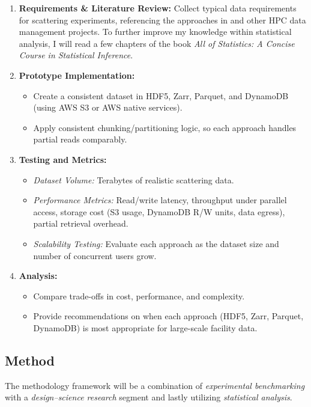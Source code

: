 \documentclass{article}
\begin{document}
\begin{enumerate}
    \item \textbf{Requirements \& Literature Review:} 
    Collect typical data requirements for scattering experiments, referencing the approaches in \cite{wang2018synchrotron, meyer2014store, moriyama2019public, kek2021aws, godoy2021efficient} and other HPC data management projects. To further improve my knowledge within statistical analysis, I will read a few chapters of the book \textit{All of Statistics: A Concise Course in Statistical Inference}. 
    \item \textbf{Prototype Implementation:}
        \begin{itemize}
            \item Create a consistent dataset in HDF5, Zarr, Parquet, and DynamoDB (using AWS S3 or AWS native services).
            \item Apply consistent chunking/partitioning logic, so each approach handles partial reads comparably.
        \end{itemize}
    \item \textbf{Testing and Metrics:}
        \begin{itemize}
            \item \emph{Dataset Volume:} Terabytes of realistic scattering data.
            \item \emph{Performance Metrics:} Read/write latency, throughput under parallel access, storage cost (S3 usage, DynamoDB R/W units, data egress), partial retrieval overhead.
            \item \emph{Scalability Testing:} Evaluate each approach as the dataset size and number of concurrent users grow.
        \end{itemize}
    \item \textbf{Analysis:}
        \begin{itemize}
            \item Compare trade-offs in cost, performance, and complexity. 
            \item Provide recommendations on when each approach (HDF5, Zarr, Parquet, DynamoDB) is most appropriate for large-scale facility data.
        \end{itemize}
\end{enumerate}

\subsection{Method}
The methodology framework will be a combination of \emph{experimental benchmarking} with a \emph{design–science research} segment and lastly utilizing \emph{statistical analysis}.
\end{document}
